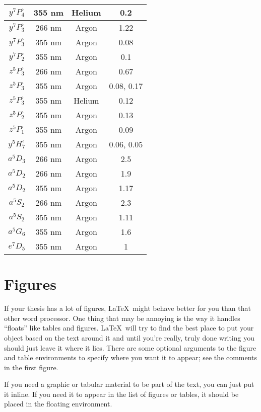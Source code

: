 \documentclass[12pt,twoside]{reedthesis}
\begin{document}
\begin{longtable}{||c|c|c|c||}
  $y^{7}P^{\circ}_{4}$ & 355 nm & Helium & 0.2 \\\hline
  $y^{7}P^{\circ}_{3}$ & 266 nm & Argon & 1.22 \\\hline
  $y^{7}P^{\circ}_{3}$ & 355 nm & Argon & 0.08 \\\hline
  $y^{7}P^{\circ}_{2}$ & 355 nm & Argon & 0.1 \\\hline
  $z^{5}P^{\circ}_{3}$ & 266 nm & Argon & 0.67 \\\hline
  $z^{5}P^{\circ}_{3}$ & 355 nm & Argon & 0.08, 0.17 \\\hline
  $z^{5}P^{\circ}_{3}$ & 355 nm & Helium & 0.12 \\\hline
  $z^{5}P^{\circ}_{2}$ & 355 nm & Argon & 0.13 \\\hline
  $z^{5}P^{\circ}_{1}$ & 355 nm & Argon & 0.09 \\\hline
  $y^{5}H^{\circ}_{7}$ & 355 nm & Argon & 0.06, 0.05 \\\hline
  $a^{5}D_{3}$ & 266 nm & Argon & 2.5 \\\hline
  $a^{5}D_{2}$ & 266 nm & Argon & 1.9 \\\hline
  $a^{5}D_{2}$ & 355 nm & Argon & 1.17 \\\hline
  $a^{5}S_{2}$ & 266 nm & Argon & 2.3 \\\hline
  $a^{5}S_{2}$ & 355 nm & Argon & 1.11 \\\hline
  $a^{5}G_{6}$ & 355 nm & Argon & 1.6 \\\hline
  $e^{7}D_{5}$ & 355 nm & Argon & 1 \\\hline

\end{longtable}


\section{Figures}

If your thesis has a lot of figures, \LaTeX\ might behave better for you than that other word processor.  One thing that may be annoying is the way it handles ``floats'' like tables and figures. \LaTeX\ will try to find the best place to put your object based on the text around it and until you're really, truly done writing you should just leave it where it lies.   There are some optional arguments to the figure and table environments to specify where you want it to appear; see the comments in the first figure.

If you need a graphic or tabular material to be part of the text, you can just put it inline. If you need it to appear in the list of figures or tables, it should be placed in the floating environment.
\end{document}
